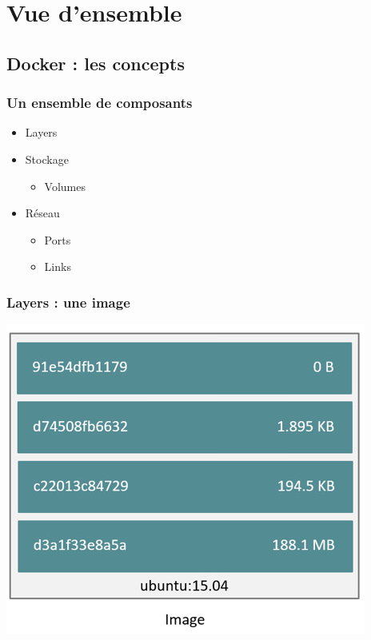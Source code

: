   \section[Docker]{Vue d'ensemble}

  \subsection[Docker]{Docker : les concepts}

  \begin{frame}
    \frametitle{Un ensemble de composants}
    \begin{itemize}
      \item Layers
      \item Stockage
      \begin{itemize}
          \item Volumes \pause
      \end{itemize}
      \item Réseau
      \begin{itemize}
          \item Ports \pause
          \item Links \pause
      \end{itemize}
    \end{itemize}
  \end{frame}

  \begin{frame}
    \frametitle{Layers : une image}
    \begin{itemize}
      \includegraphics[width=\linewidth,height=\textheight]{images/docker/image-layers.jpg}
    \end{itemize}
  \end{frame}

